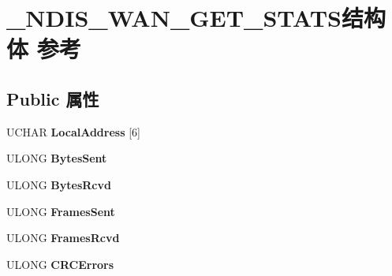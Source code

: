 \hypertarget{struct___n_d_i_s___w_a_n___g_e_t___s_t_a_t_s}{}\section{\+\_\+\+N\+D\+I\+S\+\_\+\+W\+A\+N\+\_\+\+G\+E\+T\+\_\+\+S\+T\+A\+T\+S结构体 参考}
\label{struct___n_d_i_s___w_a_n___g_e_t___s_t_a_t_s}
\subsection*{Public 属性}
\begin{DoxyCompactItemize}
\item 
\mbox{\label{struct___n_d_i_s___w_a_n___g_e_t___s_t_a_t_s_a59e46bcfcd97ed772e398fafb08b9d62}} 
U\+C\+H\+AR {\bfseries Local\+Address} \mbox{[}6\mbox{]}
\item 
\mbox{\label{struct___n_d_i_s___w_a_n___g_e_t___s_t_a_t_s_ad7e19664598a783289b37383a64af1d1}} 
U\+L\+O\+NG {\bfseries Bytes\+Sent}
\item 
\mbox{\label{struct___n_d_i_s___w_a_n___g_e_t___s_t_a_t_s_a806e03be497250620d175058792af6d6}} 
U\+L\+O\+NG {\bfseries Bytes\+Rcvd}
\item 
\mbox{\label{struct___n_d_i_s___w_a_n___g_e_t___s_t_a_t_s_a339a897291fc973f6a949631fa7510f0}} 
U\+L\+O\+NG {\bfseries Frames\+Sent}
\item 
\mbox{\label{struct___n_d_i_s___w_a_n___g_e_t___s_t_a_t_s_af04fcc843b367a8cb37bcd2f8e4a68b5}} 
U\+L\+O\+NG {\bfseries Frames\+Rcvd}
\item 
\mbox{\label{struct___n_d_i_s___w_a_n___g_e_t___s_t_a_t_s_a8e0ccbdb373357ac8b8b9b20e99eec8c}} 
U\+L\+O\+NG {\bfseries C\+R\+C\+Errors}
\item 
\mbox{\label{struct___n_d_i_s___w_a_n___g_e_t___s_t_a_t_s_a890183c48ea378305f428573fae77b12}} 

\end{DoxyCompactItemize}
